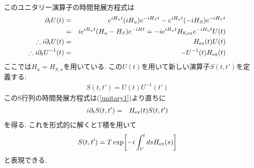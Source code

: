 \documentclass[10.5pt,a4paper]{jreport}
\begin{document}
このユニタリー演算子の時間発展方程式は
\begin{eqnarray}
\nonumber  \partial_tU(t) &=& e^{iH_ut}(iH_u)e^{-iH_St} -e^{iH_ut}(-iH_S)e^{-iH_St}\\
  &=& ie^{iH_ut}(H_u - H_S)e^{-iHt} = -ie^{iH_ut}H_{\rm S, ex}e^{-iH_ut}U(t)\\
\therefore i\partial_tU(t) &=& H_{\rm ex}(t)U(t)\label{unitary1}\\
\therefore i\partial_tU^{-1}(t) &=& -U^{-1}(t)H_{\rm ex}(t)\label{unitary2}
\end{eqnarray}
ここでは$H_u = H_{S, u}$を用いている. この$U(t)$を用いて新しい演算子$S(t, t')$を定義する:
\begin{eqnarray}
  S(t, t') = U(t)U^{-1}(t')
\end{eqnarray}
このS行列の時間発展方程式は(\ref{unitary1})より直ちに
\begin{eqnarray}
  i\partial_tS(t, t') &=& H_{\rm ex}(t)S(t, t')
\end{eqnarray}
を得る. これを形式的に解くとT積を用いて
\begin{eqnarray}
  S(t, t') = T\exp[-i\int_{t'}^{t}ds H_{\rm ex}(s)]
\end{eqnarray}
と表現できる.
\end{document}

